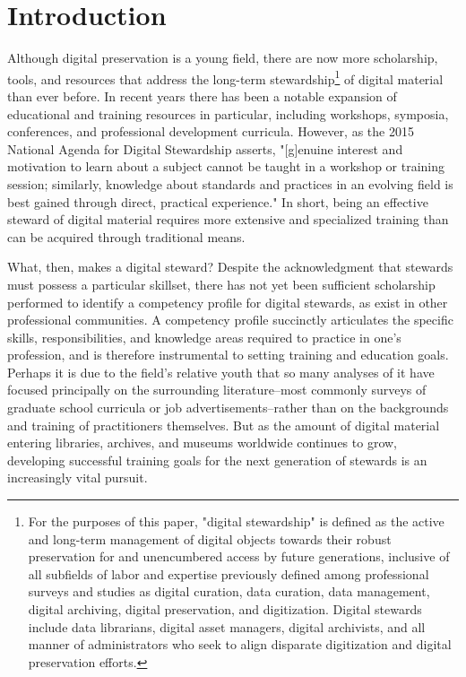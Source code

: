 \documentclass{acm_proc_article-sp}
\begin{document}
\section{Introduction}
Although digital preservation is a young field, there are now more scholarship, tools, and resources that address the long-term stewardship\footnote{For the purposes of this paper, "digital stewardship" is defined as the active and long-term management of digital objects towards their robust preservation for and unencumbered access by future generations, inclusive of all subfields of labor and expertise previously defined among professional surveys and studies as digital curation, data curation, data management, digital archiving, digital preservation, and digitization. Digital stewards include data librarians, digital asset managers, digital archivists, and all manner of administrators who seek to align disparate digitization and digital preservation efforts.} of digital material than ever before. In recent years there has been a notable expansion of educational and training resources in particular, including workshops, symposia, conferences, and professional development curricula. However, as the 2015 National Agenda for Digital Stewardship asserts, "[g]enuine interest and motivation to learn about a subject cannot be taught in a workshop or training session; similarly, knowledge about standards and practices in an evolving field is best gained through direct, practical experience."\cite{1} In short, being an effective steward of digital material requires more extensive and specialized training than can be acquired through traditional means.

What, then, makes a digital steward? Despite the acknowledgment that stewards must possess a particular skillset, there has not yet been sufficient scholarship performed to identify a competency profile for digital stewards, as exist in other professional communities. A competency profile succinctly articulates the specific skills, responsibilities, and knowledge areas required to practice in one's profession, and is therefore instrumental to setting training and education goals. Perhaps it is due to the field's relative youth that so many analyses of it have focused principally on the surrounding literature--most commonly surveys of graduate school curricula or job advertisements--rather than on the backgrounds and training of practitioners themselves. But as the amount of digital material entering libraries, archives, and museums worldwide continues to grow, developing successful training goals for the next generation of stewards is an increasingly vital pursuit.  
\end{document}
